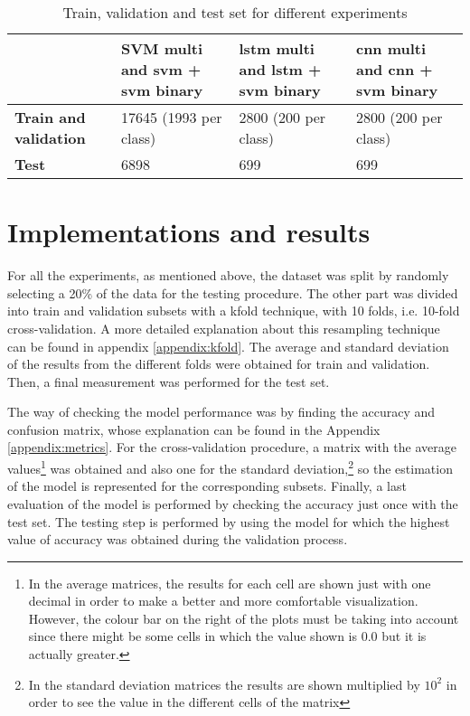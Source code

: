 	
	\begin{table}[H]
		\centering
		\begin{tabular}{|| m{5em} | m{9em} | m{9em} | m{9em} ||}
			\hline
			& \textbf{SVM multi and \acrshort{svm} + \acrshort{svm} binary} & \textbf{\acrshort{lstm} multi and \acrshort{lstm} + \acrshort{svm} binary} & \textbf{\acrshort{cnn} multi and \acrshort{cnn} + \acrshort{svm} binary}  \\
			\hline\hline
			\textbf{Train and validation} & 17645 (1993 per class) & 2800 (200 per class) & 2800 (200 per class) \\
			\hline
			\textbf{Test} & 6898 & 699 & 699 \\
			\hline                    
		\end{tabular}
		\caption{Train, validation and test set for different experiments}
		\label{table:8}
	\end{table}

\section{Implementations and results}

	For all the experiments, as mentioned above, the dataset was split by randomly selecting a 20\% of the data for the testing procedure. The other part was divided into train and validation subsets with a \acrlong{kfold} technique, with 10 folds, i.e. 10-fold cross-validation. A more detailed explanation about this resampling technique can be found in appendix \ref{appendix:kfold}. The average and standard deviation of the results from the different folds were obtained for train and validation. Then, a final measurement was performed for the test set. 
	
	The way of checking the model performance was by finding the accuracy and confusion matrix, whose explanation can be found in the Appendix \ref{appendix:metrics}. For the cross-validation procedure, a matrix with the average values\footnote{In the average matrices, the results for each cell are shown just with one decimal in order to make a better and more comfortable visualization. However, the colour bar on the right of the plots must be taking into account since there might be some cells in which the value shown is $0.0$ but it is actually greater.} was obtained and also one for the standard deviation,\footnote{In the standard deviation matrices the results are shown multiplied by $10^{2}$ in order to see the value in the different cells of the matrix} so the estimation of the model is represented for the corresponding subsets. Finally, a last evaluation of the model is performed by checking the accuracy just once with the test set. The testing step is performed by using the model for which the highest value of accuracy was obtained during the validation process.
	

